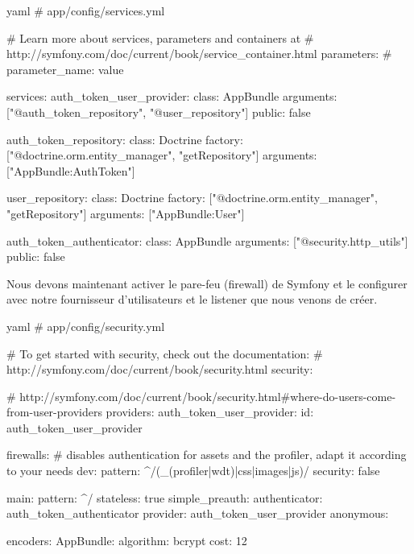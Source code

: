 \documentclass[big]{zmdocument}
\begin{document}
\begin{CodeBlock}{yaml}
# app/config/services.yml

# Learn more about services, parameters and containers at
# http://symfony.com/doc/current/book/service_container.html
parameters:
#    parameter_name: value

services:
    auth_token_user_provider:
        class: AppBundle\Security\AuthTokenUserProvider
        arguments: ["@auth_token_repository", "@user_repository"]
        public:    false

    auth_token_repository:
        class:   Doctrine\ORM\EntityManager
        factory: ["@doctrine.orm.entity_manager", "getRepository"]
        arguments: ["AppBundle:AuthToken"]

    user_repository:
        class:   Doctrine\ORM\EntityManager
        factory: ["@doctrine.orm.entity_manager", "getRepository"]
        arguments: ["AppBundle:User"]

    auth_token_authenticator:
        class:     AppBundle\Security\AuthTokenAuthenticator
        arguments: ["@security.http_utils"]
        public:    false
\end{CodeBlock}



Nous devons maintenant activer le pare-feu (firewall) de Symfony et le configurer avec notre fournisseur d'utilisateurs et le listener que nous venons de créer.



\begin{CodeBlock}{yaml}
# app/config/security.yml

# To get started with security, check out the documentation:
# http://symfony.com/doc/current/book/security.html
security:

    # http://symfony.com/doc/current/book/security.html#where-do-users-come-from-user-providers
    providers:
        auth_token_user_provider:
            id: auth_token_user_provider

    firewalls:
        # disables authentication for assets and the profiler, adapt it according to your needs
        dev:
            pattern: ^/(_(profiler|wdt)|css|images|js)/
            security: false

        main:
            pattern: ^/
            stateless: true
            simple_preauth:
                authenticator: auth_token_authenticator
            provider: auth_token_user_provider
            anonymous: ~

    encoders:
        AppBundle\Entity\User:
            algorithm: bcrypt
            cost: 12
\end{CodeBlock}
\end{document}
